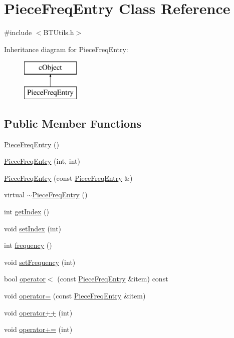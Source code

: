\hypertarget{classPieceFreqEntry}{}\section{Piece\+Freq\+Entry Class Reference}
\label{classPieceFreqEntry}


{\ttfamily \#include $<$B\+T\+Utils.\+h$>$}

Inheritance diagram for Piece\+Freq\+Entry\+:\begin{figure}[H]
\begin{center}
\leavevmode
\includegraphics[height=2.000000cm]{classPieceFreqEntry}
\end{center}
\end{figure}
\subsection*{Public Member Functions}
\begin{DoxyCompactItemize}
\item 
\hyperlink{classPieceFreqEntry_a0e464a4934e49f90efcfa802bfa7fdf6}{Piece\+Freq\+Entry} ()
\item 
\hyperlink{classPieceFreqEntry_adafb0be76054575c5f14236ecd32b4fe}{Piece\+Freq\+Entry} (int, int)
\item 
\hyperlink{classPieceFreqEntry_ab2d463151a3da40dc28e6a689394ffc9}{Piece\+Freq\+Entry} (const \hyperlink{classPieceFreqEntry}{Piece\+Freq\+Entry} \&)
\item 
virtual \hyperlink{classPieceFreqEntry_a6a5abb3209e9378fe5e5517ccea608fc}{$\sim$\+Piece\+Freq\+Entry} ()
\item 
int \hyperlink{classPieceFreqEntry_a7ff67106af5a5c461aae6b6a715522f0}{get\+Index} ()
\item 
void \hyperlink{classPieceFreqEntry_a6bdabb68a3d55489e08f7d3ff890bc74}{set\+Index} (int)
\item 
int \hyperlink{classPieceFreqEntry_af99f1ee99558ca892e0970f7c82d34c5}{frequency} ()
\item 
void \hyperlink{classPieceFreqEntry_a2d8c5fa9352de498474563fabffa6bd7}{set\+Frequency} (int)
\item 
bool \hyperlink{classPieceFreqEntry_ab31f7040904772302581553cea97a293}{operator$<$} (const \hyperlink{classPieceFreqEntry}{Piece\+Freq\+Entry} \&item) const 
\item 
void \hyperlink{classPieceFreqEntry_adf78afa1bb62e20274d18b216a960def}{operator=} (const \hyperlink{classPieceFreqEntry}{Piece\+Freq\+Entry} \&item)
\item 
void \hyperlink{classPieceFreqEntry_adbb5d3599d155b18050b1ac3cbc4d6a1}{operator++} (int)
\item 
void \hyperlink{classPieceFreqEntry_af209878df02faeea7cb2b9949f916a2d}{operator+=} (int)
\end{DoxyCompactItemize}
